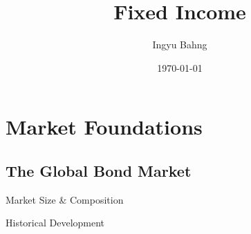 \documentclass[10pt]{article}
\title{Fixed Income}
\date{\today}
\author{Ingyu Bahng}
\begin{document}


\section{Market Foundations}

  \subsection{The Global Bond Market}

    \begin{core}{Market Size \& Composition}





    \end{core}

    \begin{core}{Historical Development}



    \end{core}
\end{document}
